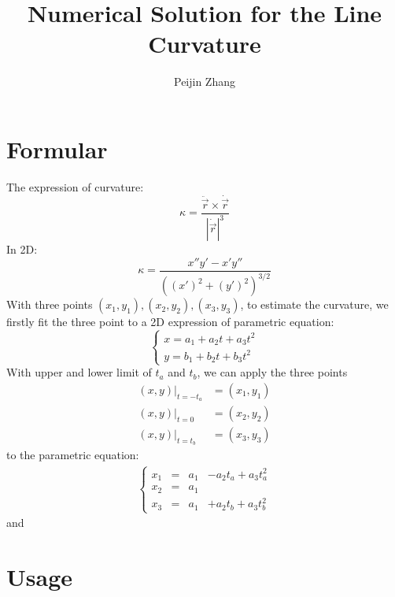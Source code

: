 \documentclass{article}
\title{Numerical Solution for the Line Curvature}
\author{Peijin Zhang}
\begin{document}
	\maketitle
	\section{Formular}
	The expression of curvature:
	\begin{equation}
	\kappa = \frac{\ddot{\vec{r}}\times\dot{\vec{r}}}{\left| \dot{\vec{r}}\right|^3}
	\end{equation}
	In 2D:
	\begin{equation}
	\kappa = \frac{x''y'-x'y''}{\left( (x')^2+(y')^2\right)^{3/2}}
	\end{equation}
	With three points $(x_1,y_1), (x_2,y_2), (x_3,y_3)$, to estimate the curvature, we firstly fit the three point to a 2D expression of parametric equation:
	\begin{equation}
	\left\{ \begin{matrix} x = a_1 +a_2 t+a_3 t^2\\ y= b_1 +b_2 t+b_3 t^2 \end{matrix} \right.
	\end{equation}
	With upper and lower limit of $t_a$ and $t_b$, we can apply the three points
	\begin{align*}
	(x,y)|_{t=-t_a} &= (x_1,y_1)\\ (x,y)|_{t=0} &= (x_2,y_2)\\ (x,y)|_{t=t_b} &= (x_3,y_3)
	\end{align*}
	 to the parametric equation:
	 \begin{align*}
	 \left\{ \begin{matrix} x_1 &= & a_1 &- a_2 t_a +a_3 t_a^2\\ x_2 &= &a_1 &\\ x_3 &= &a_1 &+ a_2 t_b + a_3 t_b^2 \end{matrix} \right.
	 \end{align*}
	 and
	 

	
	\section{Usage}
\end{document}
